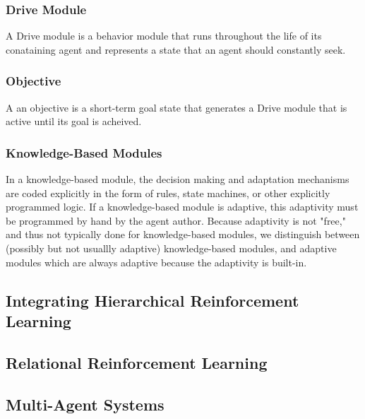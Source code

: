\subsubsection{Drive Module}

A Drive module is a behavior module that runs throughout the life of
its conataining agent and represents a state that an agent should
constantly seek.


\subsubsection{Objective}

A an objective is a short-term goal state that generates a Drive module
that is active until its goal is acheived.


\subsubsection{Knowledge-Based Modules}

In a knowledge-based module, the decision making and adaptation
mechanisms are coded explicitly in the form of rules, state machines,
or other explicitly programmed logic.  If a knowledge-based module is
adaptive, this adaptivity must be programmed by hand by the agent
author.  Because adaptivity is not "free," and thus not typically done
for knowledge-based modules, we distinguish between (possibly but not
usuallly adaptive) knowledge-based modules, and adaptive modules which
are always adaptive because the adaptivity is built-in.


\subsection{Integrating Hierarchical Reinforcement Learning}


\subsection{Relational Reinforcement Learning}

\subsection{Multi-Agent Systems}
